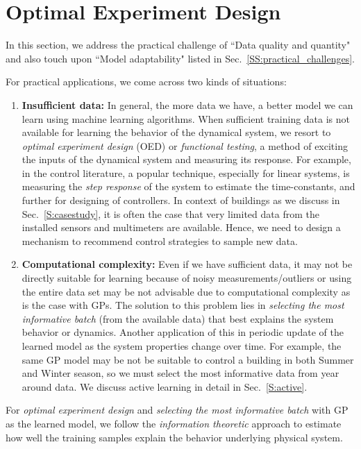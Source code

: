 \section{Optimal Experiment Design}
\label{S:oed}

In this section, we address the practical challenge of ``Data quality and quantity" and also touch upon ``Model adaptability" listed in Sec.~\ref{SS:practical_challenges}.

For practical applications, we come across two kinds of situations:
\begin{enumerate}
	\item \textbf{Insufficient data:} In general, the more data we have, a better model we can learn using machine learning algorithms. When sufficient training data is not available for learning the behavior of the dynamical system, we resort to \textit{optimal experiment design} (OED) or \textit{functional testing}, a method of exciting the inputs of the dynamical system and measuring its response. For example, in the control literature, a popular technique, especially for linear systems, is measuring the \textit{step response} of the system to estimate the time-constants, and further for designing of controllers. In context of buildings as we discuss in Sec.~\ref{S:casestudy}, it is often the case that very limited data from the installed sensors and multimeters are available. Hence, we need to design a mechanism to recommend control strategies to sample new data.
	
	\item \textbf{Computational complexity:} Even if we have sufficient data, it may not be directly suitable for learning because of noisy measurements/outliers or using the entire data set may be not advisable due to computational complexity as is the case with GPs. The solution to this problem lies in \textit{selecting the most informative batch} (from the available data) that best explains the system behavior or dynamics. Another application of this in periodic update of the learned model as the system properties change over time. For example, the same GP model may be not be suitable to control a building in both Summer and Winter season, so we must select the most informative data from year around data. We discuss active learning in detail in Sec.~\ref{S:active}.
\end{enumerate}

For \textit{optimal experiment design} and \textit{selecting the most informative batch} with GP as the learned model, we follow the \textit{information theoretic} approach to estimate how well the training samples explain the behavior underlying physical system.

